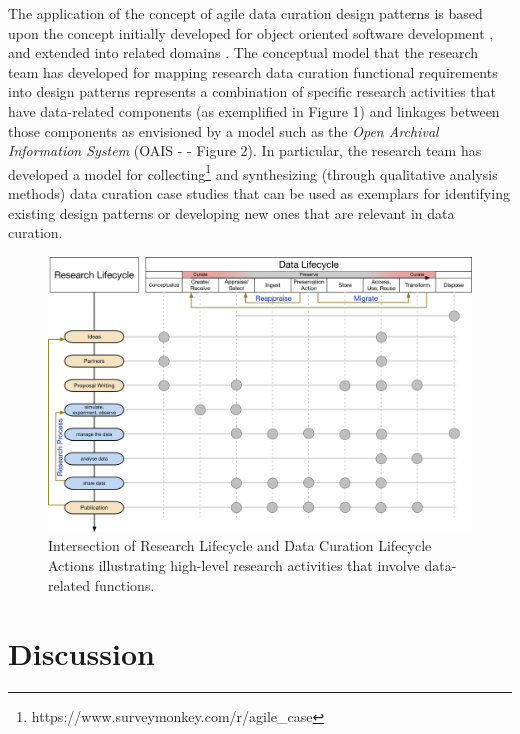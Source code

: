 \documentclass[paper]{ijdc-v9}
\begin{document}
The application of the concept of agile data curation design patterns is
based upon the concept initially developed for object oriented software
development \autocite{gamma_design_1995}, and extended into related
domains
\autocites[e.g.][]{daigneau_service_2011}{lasater_design_2010}{ackerman_patterns-based_2010}{schwinn_design_2005}{hohpe_enterprise_2003}.
The conceptual model that the research team has developed for mapping
research data curation functional requirements into design patterns
represents a combination of specific research activities that have
data-related components (as exemplified in Figure 1) and linkages
between those components as envisioned by a model such as the \emph{Open
Archival Information System} (OAIS -
\autocites{book_reference_2012}{_iso_2012}{oclc_open_2014} - Figure 2).
In particular, the research team has developed a model for
collecting\footnote{https://www.surveymonkey.com/r/agile\_case} and
synthesizing (through qualitative analysis methods) data curation case
studies that can be used as exemplars for identifying existing design
patterns or developing new ones that are relevant in data curation.

\begin{figure}
\centering
\includegraphics{Research-DataLifecycleIntegration.png}
\caption{Intersection of Research Lifecycle \autocite{_how_2014} and
Data Curation Lifecycle Actions
\autocite{digital_curation_centre_dcc_dcc_nd} illustrating high-level
research activities that involve data-related functions.}
\end{figure}

\section{Discussion}\label{discussion}
\end{document}
